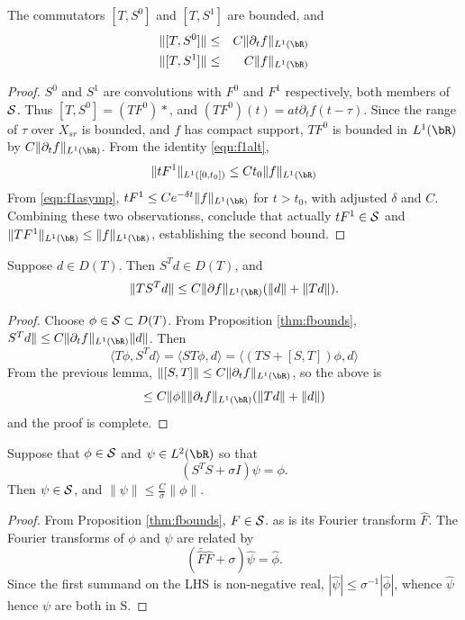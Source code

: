 \begin{lemma}
  \label{thm:commbnds}
  The commutators $[T,S^0]$ and $[T,S^1]$ are bounded, and
  \begin{eqnarray}
    \label{commbnd0}
    \|[T,S^0]\| &\le & C\|\partial_t f\|_{L^1(\bR)}\\
    \label{commbnd1}
    \|[T,S^1]\| &\le & C\|f\|_{L^1(\bR)}
  \end{eqnarray}
\end{lemma}
\begin{proof} $S^0$ and $S^1$ are convolutions with $F^0$ and $F^1$
  respectively, both members of ${\cal S}$. Thus $[T,S^0] = (TF^0)*$,
  and $(TF^0)(t) =  a t \partial_t f(t-\tau)$.
  Since the range of $\tau$ over $X_{sr}$ is bounded, and $f$ has
  compact support, $TF^0$ is  bounded in $L^1(\bR)$ by
  $C\|\partial_t f\|_{L^1(\bR)}$. From the identity \ref{eqn:f1alt},
  \[
    \|tF^1\|_{L^1([0,t_0])} \le C t_0 \|f\|_{L^1(\bR)}
  \]
  From \ref{eqn:f1asymp}, $tF^1\le Ce^{-\delta t}\|f\|_{L^1(\bR)}$ for
  $t>t_0$, with adjusted $\delta$ and $C$.  Combining these two
  observationss, conclude that actually $tF^1 \in {\cal S}$ and
  $\|TF^1\|_{L^1(\bR)} \le \| f\|_{L^1(\bR)}$, establishing the second bound.
\end{proof}

\begin{lemma}
  \label{thm:rhsbnd}
  Suppose $d \in D(T)$. Then $S^T d \in D(T)$, and
  \begin{equation}
    \label{eqn:rhsbnd}
    \|TS^Td\| \le C\|\partial f\|_{L^1(\bR)} (\|d\| +
    \|Td\|).
  \end{equation}
  
\end{lemma}
\begin{proof}
  Choose $\phi \in {\cal S} \subset D(T)$. From Proposition
  \ref{thm:fbounds}, $S^Td\| \le C\|\partial_t f\|_{L^1(\bR)}\|d\|$. Then
  \[
    \langle T\phi, S^Td \rangle = \langle ST\phi,d\rangle = \langle
    (TS + [S,T])\phi, d\rangle 
  \]
  From the previous lemma, $\|[S,T]\| \le C\|\partial_t
  f\|_{L^1(\bR)}$, so the above is
  \[
    \le C\|\phi\| \|\partial_t f\|_{L^1(\bR)}(\|Td\| + \|d\|)
  \]
  and the proof is complete.
\end{proof}

\begin{lemma}
  \label{thm:invest}
  Suppose that $\phi \in {\cal S}$ and $\psi \in L^2(\bR)$ so that
  \[
    (S^TS + \sigma I)\psi = \phi.
  \]
  Then $\psi \in {\cal S}$, and $\|\psi\| \le \frac{C}{\sigma}\|\phi\|$.
\end{lemma}
\begin{proof}
  From Proposition \ref{thm:fbounds}, $F \in {\cal S}$. as is its
  Fourier transform $\hat{F}$. The Fourier transforms of $\phi$ and
  $\psi$ are related by
  \[
    (\bar{\hat{F}}\hat{F} + \sigma)\hat{\psi} = \hat{\phi}.
  \]
  Since the first summand on the LHS is non-negative real,
 $ |\hat{\psi}| \le \sigma^{-1}|\hat{\phi}|$, whence $\hat{\psi}$
 hence $\psi$ are both in {\cal S}.
 \end{proof}
   

